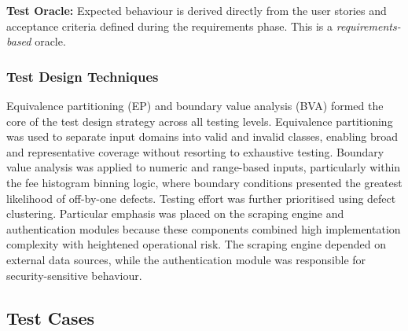 \noindent\textbf{Test Oracle:} Expected behaviour is derived directly from the user stories and acceptance criteria defined during the requirements phase. This is a \textit{requirements-based} oracle.

\subsubsection*{Test Design Techniques}

Equivalence partitioning (EP) and boundary value analysis (BVA) formed the core of the test design strategy across all testing levels. Equivalence partitioning was used to separate input domains into valid and invalid classes, enabling broad and representative coverage without resorting to exhaustive testing. Boundary value analysis was applied to numeric and range-based inputs, particularly within the fee histogram binning logic, where boundary conditions presented the greatest likelihood of off-by-one defects. Testing effort was further prioritised using defect clustering. Particular emphasis was placed on the scraping engine and authentication modules because these components combined high implementation complexity with heightened operational risk. The scraping engine depended on external data sources, while the authentication module was responsible for security-sensitive behaviour.

\subsection{Test Cases}


